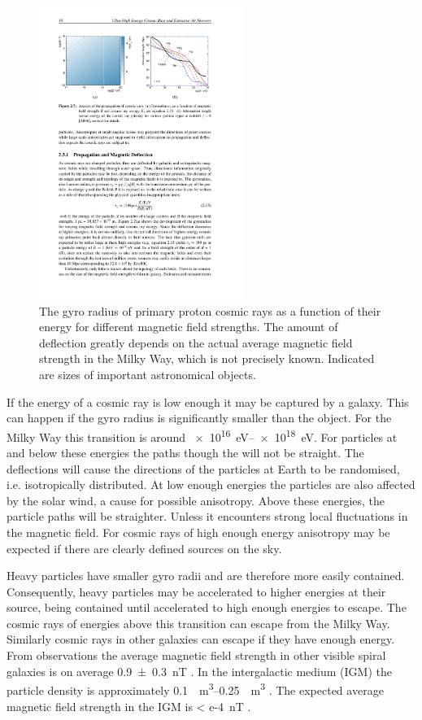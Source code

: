\begin{figure}
    \centering
    \includegraphics[width=0.6\textwidth]
                    {plots/cosmic-rays/gyroradius}
    \caption{The gyro radius of primary proton cosmic rays as a function of their energy for different magnetic field strengths. The amount of deflection greatly depends on the actual average magnetic field strength in the Milky Way, which is not precisely known. Indicated are sizes of important astronomical objects.}
    \label{fig:gyroradius}
\end{figure}

If the energy of a cosmic ray is low enough it may be captured by a galaxy. This can happen if the gyro radius is significantly smaller than the object. For the Milky Way this transition is around \SIrange{e16}{e18}{\eV}. For particles at and below these energies the paths though the \ism will not be straight. The deflections will cause the directions of the particles at Earth to be randomised, i.e. isotropically distributed. At low enough energies the particles are also affected by the solar wind, a cause for possible anisotropy. Above these energies, the particle paths will be straighter. Unless it encounters strong local fluctuations in the magnetic field. For cosmic rays of high enough energy anisotropy may be expected if there are clearly defined sources on the sky.

Heavy particles have smaller gyro radii and are therefore more easily contained. Consequently, heavy particles may be accelerated to higher energies at their source, being contained until accelerated to high enough energies to escape. The cosmic rays of energies above this transition can escape from the Milky Way. Similarly cosmic rays in other galaxies can escape if they have enough energy. From observations the average magnetic field strength in other visible spiral galaxies is on average \SI{.9 \pm .3}{\nano\tesla} \cite{jansson2010magnetic}. In the intergalactic medium (IGM) the particle density is approximately \SIrange{0.1}{0.25}{\per\meter\cubed} \cite{copi1995igm}. The expected average magnetic field strength in the IGM is \SI{< e-4}{\nano\tesla} \cite{kronberg1994igm}.

